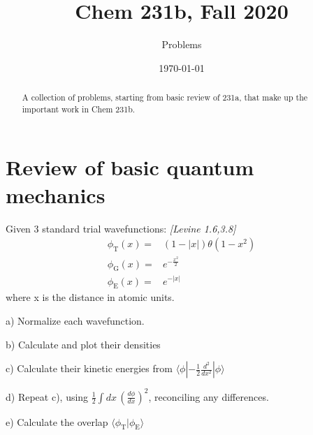 

\def\ba{{\bf a}}
\def\bb{{\bf b}}
\def\bc{{\bf c}}
\def\bp{{\bf p}}
\def\br{{\bf r}}
\def\bu{{\bf u}}
\def\bv{{\bf v}}
\def\bx{{\bf x}}
\def\bA{{\bf A}}
\def\bB{{\bf B}}
\def\bC{{\bf C}}
\def\bE{{\bf E}}
\def\cE{{\cal E}}
\def\bF{{\bf F}}
\def\bN{{\bf N}}
\def\bR{{\bf R}}
\def\bL{{\bf L}}
\def\bP{{\bf P}}
\def\ext{^{\rm ext}}
\def\sol#1{{\em\tiny #1}}
\def\sol#1{}

\usepackage{subcaption}
\graphicspath{ {./images/} }
\newcommand{\be}{\begin{equation*}}
\newcommand{\ee}{\end{equation*}}
\newcommand{\thus}{\quad\rightarrow\quad}


\sf

\title{Chem 231b, Fall 2020}
\author{Problems}
\date{\today}
\begin{abstract}
A collection of problems, starting from basic review of 231a,
that make up the important work in Chem 231b.
\end{abstract}
\maketitle
\tableofcontents

\newpage
\part{Review of basic quantum mechanics}
\newpage
{}

Given 3 standard trial wavefunctions:
{\em [Levine 1.6,3.8]}
\begin{align}
   \phi_{\text{T}}(x) = & (1 - |x|) \theta(1-x^2) \\
   \phi_{\text{G}}(x) = & e^{-\frac{x^2}{2}} \\
   \phi_{\text{E}}(x) = & e^{-|x|}
\end{align}
where x is the distance in atomic units.

a) Normalize each wavefunction.

b) Calculate and plot their densities

c) Calculate their kinetic energies from $\langle\phi|-\frac{1}{2}\frac{d^2}{dx^2}|\phi\rangle$

d) Repeat c), using $\frac{1}{2}\int dx\, (\frac{d\phi}{dx})^2$, reconciling
any differences.

e) Calculate the overlap $\langle\phi_{\text{T}}|\phi_{\text{E}}\rangle$

